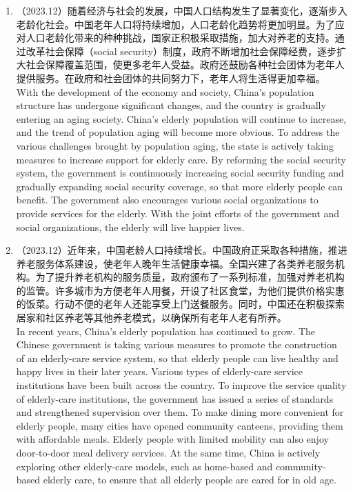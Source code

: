 ﻿\documentclass[lang=cn,11pt]{elegantbook}
\begin{document}
\begin{enumerate}
    \item （2023.12）随着经济与社会的发展，中国人口结构发生了显著变化，逐渐步入老龄化社会。中国老年人口将持续增加，人口老龄化趋势将更加明显。为了应对人口老龄化带来的种种挑战，国家正积极采取措施，加大对养老的支持。通过改革社会保障（social security）制度，政府不断增加社会保障经费，逐步扩大社会保障覆盖范围，使更多老年人受益。政府还鼓励各种社会团体为老年人提供服务。在政府和社会团体的共同努力下，老年人将生活得更加幸福。\\With the development of the economy and society, China’s population structure has undergone significant changes, and the country is gradually entering an aging society. China’s elderly population will continue to increase, and the trend of population aging will become more obvious. To address the various challenges brought by population aging, the state is actively taking measures to increase support for elderly care. By reforming the social security system, the government is continuously increasing social security funding and gradually expanding social security coverage, so that more elderly people can benefit. The government also encourages various social organizations to provide services for the elderly. With the joint efforts of the government and social organizations, the elderly will live happier lives.
    \item （2023.12）近年来，中国老龄人口持续增长。中国政府正采取各种措施，推进养老服务体系建设，使老年人晚年生活健康幸福。全国兴建了各类养老服务机构。为了提升养老机构的服务质量，政府颁布了一系列标准，加强对养老机构的监管。许多城市为方便老年人用餐，开设了社区食堂，为他们提供价格实惠的饭菜。行动不便的老年人还能享受上门送餐服务。同时，中国还在积极探索居家和社区养老等其他养老模式，以确保所有老年人老有所养。\\In recent years, China’s elderly population has continued to grow. The Chinese government is taking various measures to promote the construction of an elderly-care service system, so that elderly people can live healthy and happy lives in their later years. Various types of elderly-care service institutions have been built across the country. To improve the service quality of elderly-care institutions, the government has issued a series of standards and strengthened supervision over them. To make dining more convenient for elderly people, many cities have opened community canteens, providing them with affordable meals. Elderly people with limited mobility can also enjoy door-to-door meal delivery services. At the same time, China is actively exploring other elderly-care models, such as home-based and community-based elderly care, to ensure that all elderly people are cared for in old age.

\end{enumerate}
\end{document}
